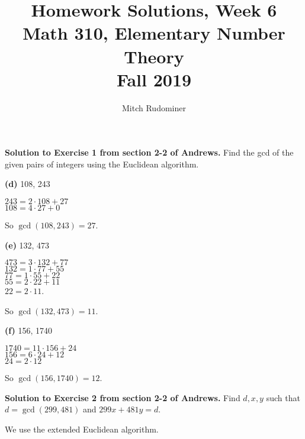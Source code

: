 \documentclass[oneside,12pt]{amsart}
\begin{document}
\title{Homework Solutions, Week 6 \\ Math 310, Elementary Number Theory \\ Fall 2019}
\author{Mitch Rudominer}

\maketitle

\textbf{Solution to Exercise 1 from section 2-2 of Andrews.} Find the gcd of the
given pairs of integers using the Euclidean algorithm.

\bigskip

\textbf{(d)}  108, 243

\bigskip

$243 = 2\cdot 108 + 27$ \\
$108 = 4\cdot27 + 0$

\bigskip

So $\gcd(108, 243) = 27$.

\bigskip

\textbf{(e)} 132, 473

\bigskip

$473 = 3\cdot 132 + 77$ \\
$132 = 1 \cdot 77 + 55$ \\
$ 77 = 1 \cdot 55 + 22$ \\
$ 55 = 2 \cdot 22 + 11$ \\
$ 22 = 2 \cdot 11$.

\bigskip

So $\gcd(132,473) = 11$.

\bigskip

\textbf{(f)} 156, 1740

\bigskip

$1740 = 11 \cdot 156 +24$ \\
$156 = 6\cdot 24 + 12$ \\
$ 24 = 2 \cdot 12$

\bigskip

So $\gcd(156,1740) = 12$.

\bigskip

\bigskip

\textbf{Solution to Exercise 2 from section 2-2 of Andrews.} Find
$d,x,y$ such that $d=\gcd(299,481)$ and $299x + 481y = d$.

\bigskip

We use the extended Euclidean algorithm.
\end{document}
